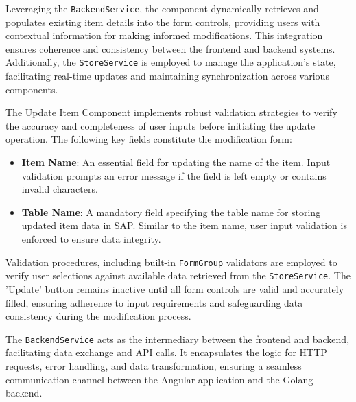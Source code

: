 Leveraging the \texttt{BackendService}, the component dynamically retrieves and populates existing item details into the form controls, providing users with contextual information for making informed modifications.
This integration ensures coherence and consistency between the frontend and backend systems.
Additionally, the \texttt{StoreService} is employed to manage the application's state, facilitating real-time updates and maintaining synchronization across various components.

The Update Item Component implements robust validation strategies to verify the accuracy and completeness of user inputs before initiating the update operation.
The following key fields constitute the modification form:

\begin{itemize}
    \item \textbf{Item Name}: An essential field for updating the name of the item.
    Input validation prompts an error message if the field is left empty or contains invalid characters.
    \item \textbf{Table Name}: A mandatory field specifying the table name for storing updated item data in SAP. Similar to the item name, user input validation is enforced to ensure data integrity.
\end{itemize}

Validation procedures, including built-in \texttt{FormGroup} validators are employed to verify user selections against available data retrieved from the \texttt{StoreService}.
The 'Update' button remains inactive until all form controls are valid and accurately filled, ensuring adherence to input requirements and safeguarding data consistency during the modification process.

The \texttt{BackendService} acts as the intermediary between the frontend and backend, facilitating data exchange and API calls.
It encapsulates the logic for HTTP requests, error handling, and data transformation, ensuring a seamless communication channel between the Angular application and the Golang backend.

